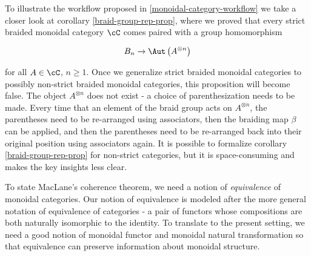 \begin{ex} To illustrate the workflow proposed in \ref{monoidal-category-workflow} we take a closer look at corollary \ref{braid-group-rep-prop}, where we proved that every strict braided monoidal category $\cC $ comes paired with a group homomorphism

$$B_n \xrightarrow{} \Aut\left(A^{\otimes n}\right)$$

for all $A\in \cC$, $n\geq 1$. Once we generalize strict braided monoidal categories to possibly non-strict braided monoidal categories, this proposition will become false. The object $A^{\otimes n}$ does not exist - a choice of parenthesization needs to be made. Every time that an element of the braid group acts on $A^{\otimes n}$, the parentheses need to be re-arranged using associators, then the braiding map $\beta$ can be applied, and then the parentheses need to be re-arranged back into their original position using associators again. It is possible to formalize corollary \ref{braid-group-rep-prop} for non-strict categories, but it is space-consuming and makes the key insights less clear.
\end{ex}

\begin{rem}
To state MacLane's coherence theorem, we need a notion of {\em equivalence} of monoidal categories. Our notion of equivalence is modeled after the more general notation of equivalence of categories - a pair of functors whose compositions are both naturally isomorphic to the identity. To translate to the present setting, we need a good notion of monoidal functor and monoidal natural transformation so that equivalence can preserve information about monoidal structure.
\end{rem}

